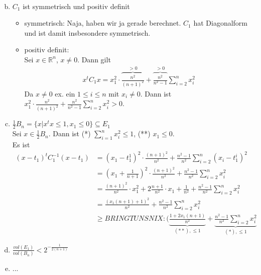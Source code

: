 \documentclass[11pt,a4paper,ngerman]{article}
\begin{document}
\begin{enumerate}[(a)]
\begin{equation*}
\begin{split}
    \end{split}\end{equation*}
\item $C_1$ ist symmetrisch und positiv definit \\
      \begin{itemize}
        \item symmetrisch: Naja, haben wir ja gerade berechnet. $C_1$ hat Diagonalform und ist damit
              insbesondere symmetrisch.
        \item positiv definit: \\
              Sei $x \in \mathbb{R}^n$, $x \neq 0$. Dann gilt
              \begin{equation}\label{eq:2}\begin{split}
                x^t C_1 x = x_1^2 \cdot \overbrace{\frac{n^2}{(n+1)^2}}^{> 0}
                            + \overbrace{\frac{n^2}{n^2-1}}^{> 0} \sum_{i=2}^n  x_i^2
              \end{split}\end{equation}
              Da $x \neq 0$ ex. ein $1 \leq i \leq n$ mit $x_i \neq 0$. Dann ist
              $x_1^2 \cdot \frac{n^2}{(n+1)^2} + \frac{n^2}{n^2-1} \sum_{i=2}^n  x_i^2 > 0$.
      \end{itemize}
\item $\frac{1}{2}B_n = \{x| x^tx \leq 1, x_1 \leq 0 \} \subseteq E_1$ \\
      Sei $x \in \frac{1}{2}B_n$. Dann ist (*) $\sum_{i=1}^n x_i^2 \leq 1$, (**) $x_1 \leq 0$.\\
      Es ist 
      \begin{equation*}\begin{split}
        (x-t_1)^t C_1^{-1} (x-t_1) &= (x_1 - t_1^1)^2 \cdot \frac{(n+1)^2}{n^2} + \frac{n^2-1}{n^2} \sum_{i=2}^n  (x_i - t_1^i)^2 \\
        &= (x_1 + \frac{1}{n+1})^2 \cdot \frac{(n+1)^2}{n^2} + \frac{n^2-1}{n^2} \sum_{i=2}^n  x_i^2 \\
        &= \frac{(n+1)^2}{n^2} \cdot x_1^2 + 2\frac{n+1}{n^2} \cdot x_1 + \frac{1}{n^2} + \frac{n^2-1}{n^2} \sum_{i=2}^n  x_i^2 \\
        &= \frac{(x_1(n+1) + 1)^2}{n^2} + \frac{n^2-1}{n^2} \sum_{i=2}^n  x_i^2 \\
        &\geq BRINGT UNS NIX :( \underbrace{\frac{1+ 2x_1(n+1)}{n^2}}_{(**), \leq 1} +  \underbrace{\frac{n^2-1}{n^2} \sum_{i=2}^n  x_i^2}_{(*), \leq 1}  
      \end{split}\end{equation*}
\item $\frac{vol(E_1)}{vol(B_n)} < 2^{- \frac{1}{2(n+1)}}$ \\
\item ...
\end{enumerate}

\label{LastPage}
\end{document}
